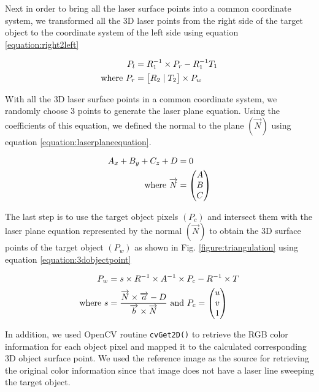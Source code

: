 Next in order to bring all the laser surface points into a common coordinate
system, we transformed all the 3D laser points from the right side of the
target object to the coordinate system of the left side using equation
\ref{equation:right2left}

\begin{align}
	\label{equation:right2left}
	P_{l} &= R_1^{-1} \times P_{r} - R_1^{-1}T_1 \\
	\text{where}~
	P_{r} &= \begin{bmatrix}
									R_2 \mid T_2
 				  \end{bmatrix} \times P_w \notag
\end{align}

With all the 3D laser surface points in a common coordinate system, we
randomly choose 3 points to generate the laser plane equation. Using the
coefficients of this equation, we defined the normal to the plane
$(\overrightarrow{N})$ using equation \ref{equation:laserplaneequation}.

\begin{align}
	\label{equation:laserplaneequation}
	A_x + B_y + C_z + D &= 0 \\
	\text{where}~
	 \overrightarrow{N} &=
	 \begin{pmatrix}
	  A \\
	  B \\
	  C \\
	 \end{pmatrix} \notag
\end{align}

The last step is to use the target object pixels $(P_c)$ and intersect them
with the laser plane equation represented by the normal $(\overrightarrow{N})$
to obtain the 3D surface points of the target object $(P_w)$ as shown in
Fig. \ref{figure:triangulation} using equation \ref{equation:3dobjectpoint}

\begin{align}
	\label{equation:3dobjectpoint}
	P_w &= s \times R^{-1}
 					 \times A^{-1}
					 \times P_c
					- R^{-1} \times T \\
	\text{where}~
	s &= \frac{\overrightarrow{N}\times\overrightarrow{a} - D}
						{\overrightarrow{b}\times\overrightarrow{N}}
  ~\text{and}~ P_c = \begin{pmatrix}
												u \\
												v \\
												1 \\
										 \end{pmatrix} \notag
\end{align}

In addition, we used OpenCV routine \texttt{cvGet2D()} to retrieve the RGB
color information for each object pixel and mapped it to the calculated
corresponding 3D object surface point. We used the reference image as the
source for retrieving the original color information since that image does not
have a laser line sweeping the target object.
